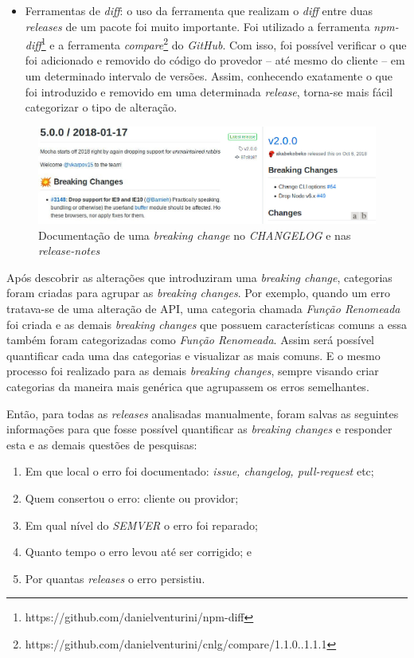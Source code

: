 \begin{itemize}
    \item Ferramentas de \textit{diff}: o uso da ferramenta que realizam o  \textit{diff} entre duas \textit{releases} de um pacote foi muito importante. Foi utilizado a ferramenta \textit{npm-diff}\footnote{https://github.com/danielventurini/npm-diff} e a ferramenta \textit{compare}\footnote{https://github.com/danielventurini/cnlg/compare/1.1.0..1.1.1} do \textit{GitHub}. Com isso, foi possível verificar o que foi adicionado e removido do código do provedor -- até mesmo do cliente -- em um determinado intervalo de versões. Assim, conhecendo exatamente o que foi introduzido e removido em uma determinada \textit{release}, torna-se mais fácil categorizar o tipo de alteração.
\end{itemize}

\begin{figure}
    \centering
    \includegraphics[scale=0.45]{figuras/bc_documentation.jpeg}
    \caption{Documentação de uma \textit{breaking change} no \textit{CHANGELOG} e nas \textit{release-notes}}
    \label{fig:bc_documentation}
\end{figure}{}

Após descobrir as alterações que introduziram uma \textit{breaking change}, categorias foram criadas para agrupar as \textit{breaking changes}. Por exemplo, quando um erro tratava-se de uma alteração de \gls{API}, uma categoria chamada \textit{Função Renomeada} foi criada e as demais \textit{breaking changes} que possuem características comuns a essa também foram categorizadas como \textit{Função Renomeada}. Assim será possível quantificar cada uma das categorias e visualizar as mais comuns. E o mesmo processo foi realizado para as demais \textit{breaking changes}, sempre visando criar categorias da maneira mais genérica que agrupassem os erros semelhantes.

Então, para todas as \textit{releases} analisadas manualmente, foram salvas as seguintes informações para que fosse possível quantificar as \textit{breaking changes} e responder esta e as demais questões de pesquisas:

\begin{enumerate}
    \item Em que local o erro foi documentado: \textit{issue, changelog, pull-request} etc;
    \item Quem consertou o erro: cliente ou providor;
    \item Em qual nível do \textit{SEMVER} o erro foi reparado;
    \item Quanto tempo o erro levou até ser corrigido; e
    \item Por quantas \textit{releases} o erro persistiu.
\end{enumerate}{}

